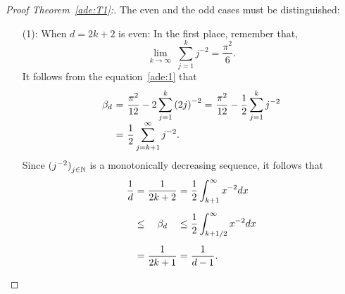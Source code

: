 \begin{proof}[Proof Theorem~\ref{ade:T1}:]\label{ade:T1P}
  The even and the odd cases must be distinguished:
  \begin{enumerate}
    \item[(1):] When $d = 2k+2$ is even:
    In the first place, remember that,
    \[ \lim_{k\to\infty}\; \sum_{j = 1}^{k} j^{-2} = \frac{\pi^2}{6}.\] 
    It follows from the equation~\ref{ade:1} that
    \[\everymath{\displaystyle}\arraycolsep=1.8pt\def\arraystretch{1.8}
      \begin{array}{rrlll}
        \beta_d & = & \frac{\pi^2}{12} - 2 \sum_{j = 1}^{k} {(2j)}^{-2}= & \frac{\pi^2}{12} - \frac{1}{2} \sum_{j = 1}^{k} j^{-2}\\
        & = & \frac{1}{2} \sum_{j = k+1}^{\infty} j^{-2}.
      \end{array}      
     \]
    Since ${(j^{-2})}_{j \in \mathbb{N}}$ is a monotonically decreasing sequence, it follows that
    \[\everymath{\displaystyle}\arraycolsep=1.5pt\def\arraystretch{1.5}
      \begin{array}{rrcll}
        \frac{1}{d}   & = & \frac{1}{2k+2}  & = & \frac{1}{2} \int_{k+1}^{\infty}x^{-2} dx\\[5mm]
      & \leq & \beta_d  & \leq & \frac{1}{2} \int_{k+1/2}^{\infty}x^{-2} dx\\[5mm]
      & = & \frac{1}{2k+1} & = & \frac{1}{d-1}.
    \end{array}  \] 


\end{enumerate}
\end{proof}
